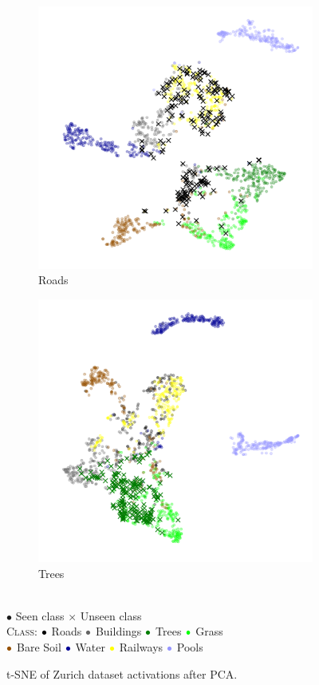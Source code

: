 \documentclass[10pt]{article}
\newcommand{\legendBullet}{
$\bullet$ Seen class $\times$ Unseen class\\
    \textsc{Class}: 
    ${\color{black}\bullet}$ Roads
    ${\color{buildings}\bullet}$ Buildings
    ${\color{trees}\bullet}$ Trees
    ${\color{grass}\bullet}$ Grass\\
    ${\color{baresoil}\bullet}$ Bare Soil
    ${\color{water}\bullet}$ Water
    ${\color{railways}\bullet}$ Railways
    ${\color{swimmingpools}\bullet}$ Pools
    }
\begin{document}
\begin{figure}[H]
    \centering
    \begin{subfigure}{.49\textwidth}
        \centering
        \includegraphics[width=\textwidth]{t-SNE_wo_cl1_after_PCA}
        \caption{Roads}
    \end{subfigure}
    \begin{subfigure}{.5\textwidth}
        \centering
        \includegraphics[width=\textwidth]{t-SNE_wo_cl3_after_PCA}
        \caption{Trees}
    \end{subfigure}
    \\[.2cm]
    \legendBullet
    \caption{\gls{t-SNE} of Zurich dataset activations after \gls{PCA}.}
    \label{fig:tsne-zurich-miscl}
\end{figure}
\end{document}
